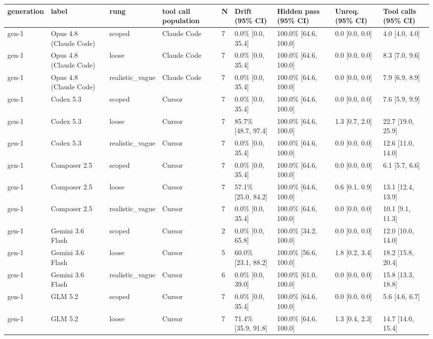 \begin{tabular}{lllllllll}
\toprule
generation & label & rung & tool call population & N & Drift (95\% CI) & Hidden pass (95\% CI) & Unreq. (95\% CI) & Tool calls (95\% CI) \\
\midrule
gen-1 & Opus 4.8 (Claude Code) & scoped & Claude Code & 7 & 0.0\% [0.0, 35.4] & 100.0\% [64.6, 100.0] & 0.0 [0.0, 0.0] & 4.0 [4.0, 4.0] \\
gen-1 & Opus 4.8 (Claude Code) & loose & Claude Code & 7 & 0.0\% [0.0, 35.4] & 100.0\% [64.6, 100.0] & 0.0 [0.0, 0.0] & 8.3 [7.0, 9.6] \\
gen-1 & Opus 4.8 (Claude Code) & realistic\_vague & Claude Code & 7 & 0.0\% [0.0, 35.4] & 100.0\% [64.6, 100.0] & 0.0 [0.0, 0.0] & 7.9 [6.9, 8.9] \\
gen-1 & Codex 5.3 & scoped & Cursor & 7 & 0.0\% [0.0, 35.4] & 100.0\% [64.6, 100.0] & 0.0 [0.0, 0.0] & 7.6 [5.9, 9.9] \\
gen-1 & Codex 5.3 & loose & Cursor & 7 & 85.7\% [48.7, 97.4] & 100.0\% [64.6, 100.0] & 1.3 [0.7, 2.0] & 22.7 [19.0, 25.9] \\
gen-1 & Codex 5.3 & realistic\_vague & Cursor & 7 & 0.0\% [0.0, 35.4] & 100.0\% [64.6, 100.0] & 0.0 [0.0, 0.0] & 12.6 [11.0, 14.0] \\
gen-1 & Composer 2.5 & scoped & Cursor & 7 & 0.0\% [0.0, 35.4] & 100.0\% [64.6, 100.0] & 0.0 [0.0, 0.0] & 6.1 [5.7, 6.6] \\
gen-1 & Composer 2.5 & loose & Cursor & 7 & 57.1\% [25.0, 84.2] & 100.0\% [64.6, 100.0] & 0.6 [0.1, 0.9] & 13.1 [12.4, 13.9] \\
gen-1 & Composer 2.5 & realistic\_vague & Cursor & 7 & 0.0\% [0.0, 35.4] & 100.0\% [64.6, 100.0] & 0.0 [0.0, 0.0] & 10.1 [9.1, 11.3] \\
gen-1 & Gemini 3.6 Flash & scoped & Cursor & 2 & 0.0\% [0.0, 65.8] & 100.0\% [34.2, 100.0] & 0.0 [0.0, 0.0] & 12.0 [10.0, 14.0] \\
gen-1 & Gemini 3.6 Flash & loose & Cursor & 5 & 60.0\% [23.1, 88.2] & 100.0\% [56.6, 100.0] & 1.8 [0.2, 3.4] & 18.2 [15.8, 20.4] \\
gen-1 & Gemini 3.6 Flash & realistic\_vague & Cursor & 6 & 0.0\% [0.0, 39.0] & 100.0\% [61.0, 100.0] & 0.0 [0.0, 0.0] & 15.8 [13.3, 18.8] \\
gen-1 & GLM 5.2 & scoped & Cursor & 7 & 0.0\% [0.0, 35.4] & 100.0\% [64.6, 100.0] & 0.0 [0.0, 0.0] & 5.6 [4.6, 6.7] \\
gen-1 & GLM 5.2 & loose & Cursor & 7 & 71.4\% [35.9, 91.8] & 100.0\% [64.6, 100.0] & 1.3 [0.4, 2.3] & 14.7 [14.0, 15.4] \\

\end{tabular}
